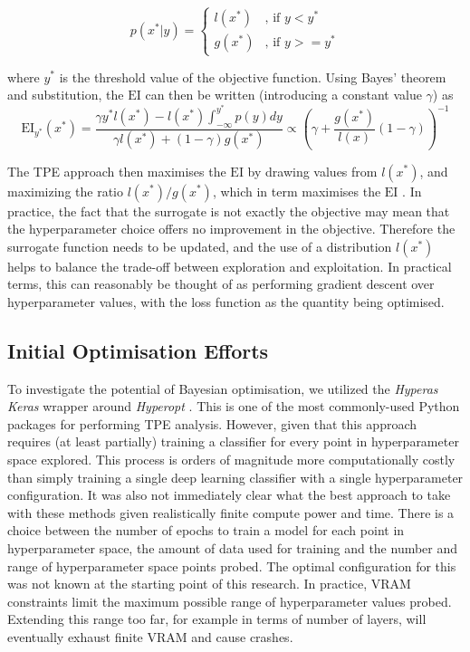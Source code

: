 \begin{equation}
    p(x^*|y) = \begin{cases} \textit{l}(x^*) & \mbox{, if }  y <y^* \\ \textit{g}(x^*) & \mbox{, if } y>=y^* \end{cases}
\end{equation}

where $y^*$ is the threshold value of the objective function. Using Bayes' theorem and substitution, the $\textrm{EI}$ can then be written (introducing a constant value $\gamma$) as 
\begin{equation}
    \textrm{EI}_{y^*}(x^*)=\frac{\gamma y^* \textit{l}(x^*)-\textit{l}(x^*)\int_{-\infty}^{y^*}p(y)dy}{\gamma \textit{l}(x^*)+(1-\gamma) \textit{g}(x^*)} \propto \left( \gamma +\frac{\textit{g}(x^*)}{\textit{l}(x)} (1-\gamma)\right)^{-1}
\end{equation}


The TPE approach then maximises the $\textrm{EI}$ by drawing values from $\textit{l}(x^*)$, and maximizing the ratio $\textit{l}(x^*)/\textit{g}(x^*)$, which in term maximises the $\textrm{EI}$ \cite{tdshyper}. In practice, the fact that the surrogate is not exactly the objective may mean that the hyperparameter choice offers no improvement in the objective. Therefore the surrogate function needs to be updated, and the use of a distribution $\textit{l}(x^*)$ helps to balance the trade-off between exploration and exploitation. In practical terms, this can reasonably be thought of as performing gradient descent over hyperparameter values, with the loss function as the quantity being optimised.

\subsection{Initial Optimisation Efforts}

To investigate the potential of Bayesian optimisation, we utilized the \textit{Hyperas} \cite{hyperas} \textit{Keras} wrapper around \textit{Hyperopt} \cite{hyperopt}. This is one of the most commonly-used Python packages for performing TPE analysis. However, given that this approach requires (at least partially) training a classifier for every point in hyperparameter space explored. This process is orders of magnitude more computationally costly than simply training a single deep learning classifier with a single hyperparameter configuration. It was also not immediately clear what the best approach to take with these methods given realistically finite compute power and time. There is a choice between the number of epochs to train a model for each point in hyperparameter space, the amount of data used for training and the number and range of hyperparameter space points probed. The optimal configuration for this was not known at the starting point of this research. In practice, VRAM constraints limit the maximum possible range of hyperparameter values probed. Extending this range too far, for example in terms of number of layers, will eventually exhaust finite VRAM and cause crashes.

